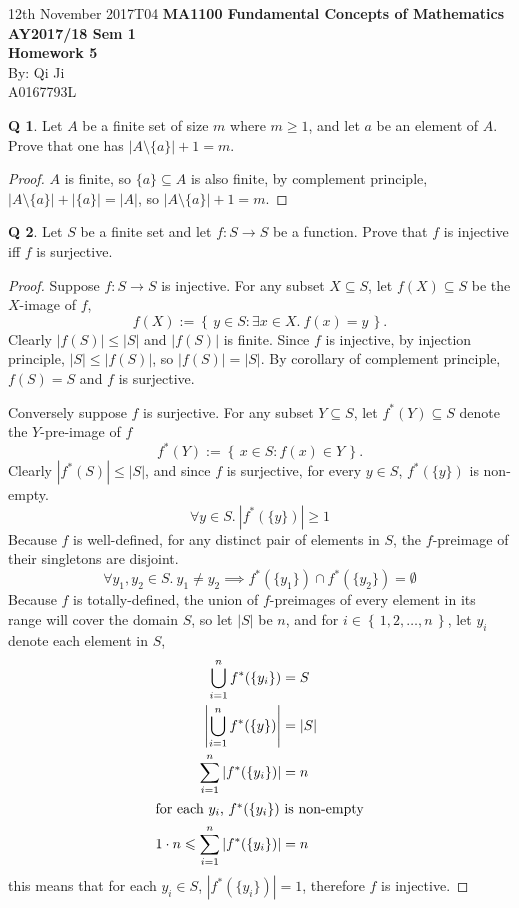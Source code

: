 \documentclass[12pt]{article}
\newcommand{\set}[1]{\left\{\,#1\,\right\}}
\theoremstyle{definition}
\newtheorem{qn}{Q}
\numberwithin{equation}{qn}
\numberwithin{lemma}{qn}
\renewcommand{\leq}{\leqslant}
\renewcommand{\geq}{\geqslant}
\begin{document}
12th November 2017\hfill T04
{
    \center\large\textbf{
        MA1100 Fundamental Concepts of Mathematics\\
        AY2017/18 Sem 1\\
        Homework 5
    }
}\\
By: Qi Ji\\
\phantom{By: }A0167793L

\begin{qn}
    Let $A$ be a finite set of size $m$ where $m\geq 1$, and let $a$ be an element of $A$.
    Prove that one has $|A\setminus\{a\}| + 1 = m$.
\end{qn}
\begin{proof}
    $A$ is finite, so $\{a\} \subseteq A$ is also finite, by complement principle,
    $|A\setminus\{a\}| + |\{a\}| = |A|$, so $|A\setminus\{a\}| + 1 = m$.
\end{proof}

\begin{qn}
    Let $S$ be a finite set and let $f:S\rightarrow S$ be a function.
    Prove that $f$ is injective iff $f$ is surjective.
\end{qn}
\begin{proof}
    Suppose $f: S\rightarrow S$ is injective.
    For any subset $X\subseteq S$, let $f(X) \subseteq S$ be the $X$-image of $f$,
    $$f(X) := \set{y\in S: \exists x\in X.~ f(x) = y}.$$
    Clearly $|f(S)| \leq |S|$ and $|f(S)|$ is finite.
    Since $f$ is injective, by injection principle,
    $|S| \leq |f(S)|$, so $|f(S)| = |S|$.
    By corollary of complement principle, $f(S) = S$ and $f$ is surjective.

    Conversely suppose $f$ is surjective. For any subset $Y\subseteq S$,
    let $f^*(Y) \subseteq S$ denote the $Y$-pre-image of $f$
    $$f^*(Y) := \set{x\in S : f(x) \in Y}.$$
    Clearly $|f^*(S)| \leq |S|$, and since $f$ is surjective,
    for every $y\in S$, $f^*(\{y\})$ is non-empty.
    $$\forall y\in S.~ |f^*(\{y\})| \geq 1$$
    Because $f$ is well-defined, for any distinct pair of elements in $S$,
    the $f$-preimage of their singletons are disjoint.
    $$\forall y_1, y_2\in S.~ y_1\ne y_2 \implies f^*(\{y_1\}) \cap f^*(\{y_2\}) = \emptyset$$
    Because $f$ is totally-defined,
    the union of $f$-preimages of every element in its range will cover the domain $S$,
    so let $|S|$ be $n$, and for $i\in\set{1,2,\dots,n}$, let $y_i$ denote each element in $S$,
    \begin{align*}
        \bigcup_{i=1}^{n} f^*(\{y_i\}) &= S\\
        \left| \bigcup_{i=1}^{n} f^*(\{y\}) \right| &= |S|\\
        \sum_{i=1}^{n} \left| f^*(\{y_i\}) \right| &= n\\
        \shortintertext{for each $y_i$, $f^*(\{y_i\})$ is non-empty}
        1\cdot n \leq \sum_{i=1}^{n} \left| f^*(\{y_i\}) \right| &= n
    \end{align*}
    this means that for each $y_i\in S$, $|f^*(\{y_i\})| = 1$, therefore $f$ is injective.
\end{proof}
\end{document}
